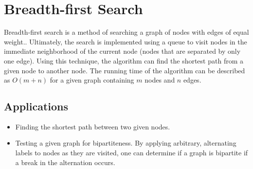 \section{Breadth-first Search}

Breadth-first search is a method of searching a graph of nodes with edges of equal weight..
Ultimately, the search is implemented using a queue to visit nodes in the immediate neighborhood of the current node (nodes that are separated by only one edge).
Using this technique, the algorithm can find the shortest path from a given node to another node.
The running time of the algorithm can be described as $O(m + n)$ for a given graph containing $m$ nodes and $n$ edges.

\subsection{Applications}

\begin{itemize}
	\item Finding the shortest path between two given nodes.
	\item Testing a given graph for bipartiteness.
	By applying arbitrary, alternating labels to nodes as they are visited, one can determine if a graph is bipartite if a break in the alternation occurs.
\end{itemize}
